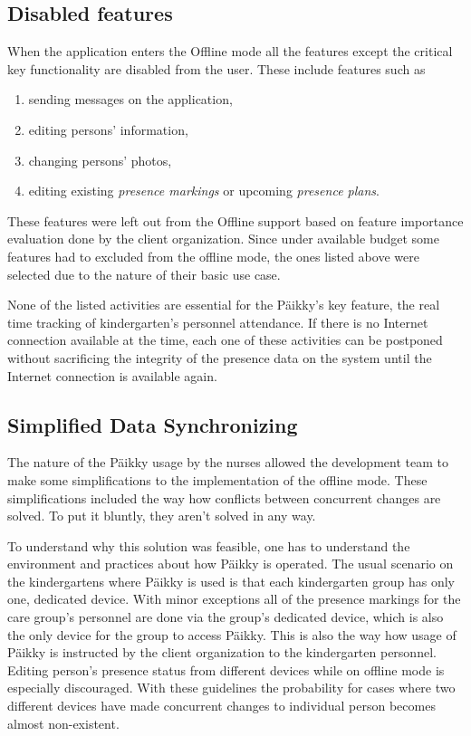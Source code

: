 \subsection{Disabled features}
When the application enters the Offline mode all the features except the critical key functionality are disabled from the user. These include features such as

\begin{enumerate}
    \item sending messages on the application,
    \item editing persons' information,
    \item changing persons' photos,
    \item editing existing \textit{presence markings} or upcoming \textit{presence plans}.
\end{enumerate}

These features were left out from the Offline support based on feature importance evaluation done by the client organization. Since under available budget some features had to excluded from the offline mode, the ones listed above were selected due to the nature of their basic use case.

None of the listed activities are essential for the Päikky's key feature, the real time tracking of kindergarten's personnel attendance. If there is no Internet connection available at the time, each one of these activities can be postponed without sacrificing the integrity of the presence data on the system until the Internet connection is available again.




\subsection{Simplified Data Synchronizing}
The nature of the Päikky usage by the nurses allowed the development team to make some simplifications to the implementation of the offline mode. These simplifications included the way how conflicts between concurrent changes are solved. To put it bluntly, they aren't solved in any way.

To understand why this solution was feasible, one has to understand the environment and practices about how Päikky is operated. The usual scenario on the kindergartens where Päikky is used is that each kindergarten group has only one, dedicated device. With minor exceptions all of the presence markings for the care group's personnel are done via the group's dedicated device, which is also the only device for the group to access Päikky. This is also the way how usage of Päikky is instructed by the client organization to the kindergarten personnel. Editing person's presence status from different devices while on offline mode is especially discouraged. With these guidelines the probability for cases where two different devices have made concurrent changes to individual person becomes almost non-existent. 

